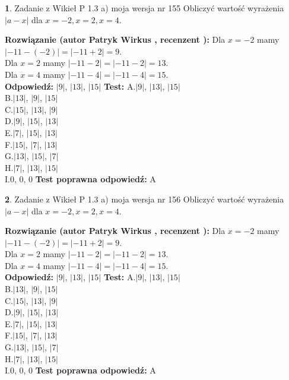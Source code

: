 \documentclass[12pt, a4paper]{article}
\theoremstyle{definition} %
\newtheorem{zad}{}
\newcommand{\zadStart}[1]{\begin{zad}#1\newline}
\newcommand{\zadStop}{\end{zad}}
\newcommand{\rozwStart}[2]{\noindent \textbf{Rozwiązanie (autor #1 , recenzent #2): }\newline}
\newcommand{\rozwStop}{\newline}
\newcommand{\odpStart}{\noindent \textbf{Odpowiedź:}\newline}
\newcommand{\odpStop}{\newline}
\newcommand{\testStart}{\noindent \textbf{Test:}\newline}
\newcommand{\testStop}{\newline}
\newcommand{\kluczStart}{\noindent \textbf{Test poprawna odpowiedź:}\newline}
\newcommand{\kluczStop}{\newline}
\begin{document}
\zadStart{Zadanie z Wikieł P 1.3 a) moja wersja nr 155}
Obliczyć wartość wyrażenia $|a - x|$ dla $x=-2,x=2,x=4$.
\zadStop
\rozwStart{Patryk Wirkus}{}
Dla $x = -2$ mamy $|-11 - (-2)| = |-11 + 2| = 9$.\\
Dla $x = 2$ mamy $|-11 - 2| = |-11 - 2| = 13$.\\
Dla $x = 4$ mamy $|-11 - 4| = |-11 - 4| = 15$.\\
\rozwStop
\odpStart
$|9|$, $|13|$, $|15|$
\odpStop
\testStart
A.$|9|$, $|13|$, $|15|$\\
B.$|13|$, $|9|$, $|15|$\\
C.$|15|$, $|13|$, $|9|$\\
D.$|9|$, $|15|$, $|13|$\\
E.$|7|$, $|15|$, $|13|$\\
F.$|15|$, $|7|$, $|13|$\\
G.$|13|$, $|15|$, $|7|$\\
H.$|7|$, $|13|$, $|15|$\\
I.$0$, $0$, $0$
\testStop
\kluczStart
A
\kluczStop



\zadStart{Zadanie z Wikieł P 1.3 a) moja wersja nr 156}
Obliczyć wartość wyrażenia $|a - x|$ dla $x=-2,x=2,x=4$.
\zadStop
\rozwStart{Patryk Wirkus}{}
Dla $x = -2$ mamy $|-11 - (-2)| = |-11 + 2| = 9$.\\
Dla $x = 2$ mamy $|-11 - 2| = |-11 - 2| = 13$.\\
Dla $x = 4$ mamy $|-11 - 4| = |-11 - 4| = 15$.\\
\rozwStop
\odpStart
$|9|$, $|13|$, $|15|$
\odpStop
\testStart
A.$|9|$, $|13|$, $|15|$\\
B.$|13|$, $|9|$, $|15|$\\
C.$|15|$, $|13|$, $|9|$\\
D.$|9|$, $|15|$, $|13|$\\
E.$|7|$, $|15|$, $|13|$\\
F.$|15|$, $|7|$, $|13|$\\
G.$|13|$, $|15|$, $|7|$\\
H.$|7|$, $|13|$, $|15|$\\
I.$0$, $0$, $0$
\testStop
\kluczStart
A
\kluczStop
\end{document}
